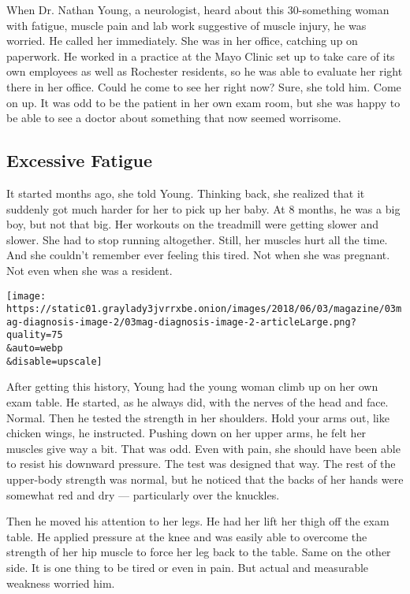 When Dr. Nathan Young, a neurologist, heard about this 30-something
woman with fatigue, muscle pain and lab work suggestive of muscle
injury, he was worried. He called her immediately. She was in her
office, catching up on paperwork. He worked in a practice at the Mayo
Clinic set up to take care of its own employees as well as Rochester
residents, so he was able to evaluate her right there in her office.
Could he come to see her right now? Sure, she told him. Come on up. It
was odd to be the patient in her own exam room, but she was happy to be
able to see a doctor about something that now seemed worrisome.

\hypertarget{excessive-fatigue}{%
\subsection{\texorpdfstring{\textbf{Excessive
Fatigue}}{Excessive Fatigue}}\label{excessive-fatigue}}

It started months ago, she told Young. Thinking back, she realized that
it suddenly got much harder for her to pick up her baby. At 8 months, he
was a big boy, but not that big. Her workouts on the treadmill were
getting slower and slower. She had to stop running altogether. Still,
her muscles hurt all the time. And she couldn't remember ever feeling
this tired. Not when she was pregnant. Not even when she was a resident.

\texttt{[image: https://static01.graylady3jvrrxbe.onion/images/2018/06/03/magazine/03mag-diagnosis-image-2/03mag-diagnosis-image-2-articleLarge.png?quality=75\\\&auto=webp\\\&disable=upscale]}

After getting this history, Young had the young woman climb up on her
own exam table. He started, as he always did, with the nerves of the
head and face. Normal. Then he tested the strength in her shoulders.
Hold your arms out, like chicken wings, he instructed. Pushing down on
her upper arms, he felt her muscles give way a bit. That was odd. Even
with pain, she should have been able to resist his downward pressure.
The test was designed that way. The rest of the upper-body strength was
normal, but he noticed that the backs of her hands were somewhat red and
dry --- particularly over the knuckles.

Then he moved his attention to her legs. He had her lift her thigh off
the exam table. He applied pressure at the knee and was easily able to
overcome the strength of her hip muscle to force her leg back to the
table. Same on the other side. It is one thing to be tired or even in
pain. But actual and measurable weakness worried him.

